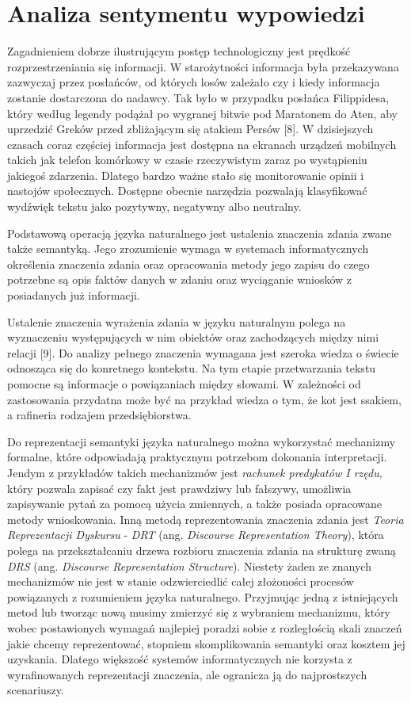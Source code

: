 \chapter{Analiza sentymentu wypowiedzi}

\qquad Zagadnieniem dobrze ilustrującym postęp technologiczny jest prędkość rozprzestrzeniania się informacji. W starożytności informacja była przekazywana zazwyczaj przez posłańców, od których losów zależało czy i kiedy informacja zostanie dostarczona do nadawcy. Tak było w przypadku posłańca Filippidesa, który według legendy podążał po wygranej bitwie pod Maratonem do Aten, aby uprzedzić Greków przed zbliżającym się atakiem Persów [8]. W dzisiejszych czasach coraz częściej informacja jest dostępna na ekranach urządzeń mobilnych takich jak telefon komórkowy w czasie rzeczywistym zaraz po wystąpieniu jakiegoś zdarzenia. Dlatego bardzo ważne stało się monitorowanie opinii i nastojów społecznych. Dostępne obecnie narzędzia pozwalają klasyfikować wydźwięk tekstu jako pozytywny, negatywny albo neutralny.

Podstawową operacją języka naturalnego jest ustalenia znaczenia zdania zwane także semantyką. Jego zrozumienie wymaga w systemach informatycznych określenia znaczenia zdania oraz opracowania metody jego zapisu do czego potrzebne są opis faktów danych w zdaniu oraz wyciąganie wniosków z posiadanych już informacji. 

Ustalenie znaczenia wyrażenia zdania w języku naturalnym polega na wyznaczeniu występujących w nim obiektów oraz zachodzących między nimi relacji [9]. Do analizy pełnego znaczenia wymagana jest szeroka wiedza o świecie odnosząca się do konretnego kontekstu. Na tym etapie przetwarzania tekstu pomocne są informacje o powiązaniach między słowami. W zależności od zastosowania przydatna może być na przykład wiedza o tym, że kot jest ssakiem, a rafineria rodzajem przedsiębiorstwa. 

Do reprezentacji semantyki języka naturalnego można wykorzystać mechanizmy formalne, które odpowiadają praktycznym potrzebom dokonania interpretacji. Jendym z przykładów takich mechanizmów jest \textit{rachunek predykatów I rzędu}, który pozwala zapisać czy fakt jest prawdziwy lub fałszywy, umożliwia zapisywanie pytań za pomocą użycia zmiennych, a także posiada opracowane metody wnioskowania. Inną metodą reprezentowania znaczenia zdania jest \textit{Teoria Reprezentacji Dyskursu} - \textit{DRT} (ang. \textit{Discourse Representation Theory}), która polega na przekształcaniu drzewa rozbioru znaczenia zdania na strukturę zwaną \textit{DRS} (ang. \textit{Discourse Representation Structure}). Niestety żaden ze znanych mechanizmów nie jest w stanie odzwierciedlić całej złożoności procesów powiązanych z rozumieniem języka naturalnego. Przyjmując jedną z istniejących metod lub tworząc nową musimy zmierzyć się z wybraniem mechanizmu, który wobec postawionych wymagań najlepiej poradzi sobie z rozległością skali znaczeń jakie chcemy reprezentować, stopniem skomplikowania semantyki oraz kosztem jej uzyskania. Dlatego większość systemów informatycznych nie korzysta z wyrafinowanych reprezentacji znaczenia, ale ogranicza ją do najprostszych scenariuszy.

